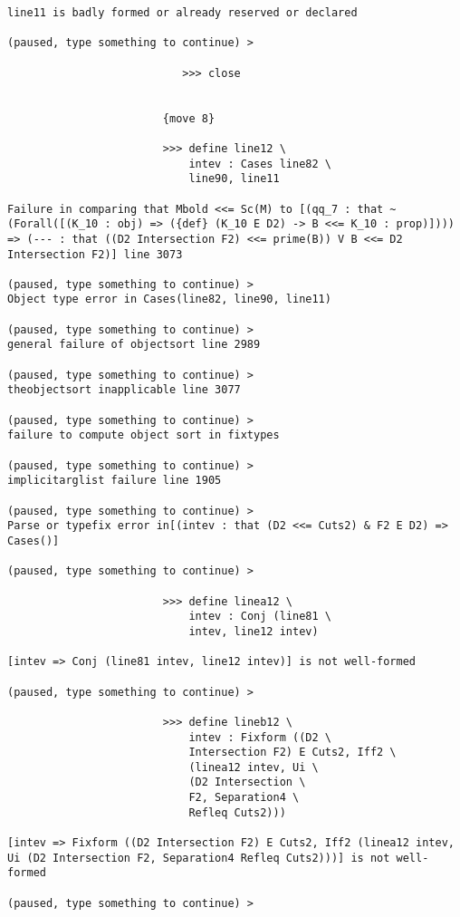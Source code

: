 \documentclass[12pt]{article}
\begin{document}
\begin{verbatim}
line11 is badly formed or already reserved or declared

(paused, type something to continue) >

                           >>> close


                        {move 8}

                        >>> define line12 \
                            intev : Cases line82 \
                            line90, line11

Failure in comparing that Mbold <<= Sc(M) to [(qq_7 : that ~(Forall([(K_10 : obj) => ({def} (K_10 E D2) -> B <<= K_10 : prop)]))) => (--- : that ((D2 Intersection F2) <<= prime(B)) V B <<= D2 Intersection F2)] line 3073

(paused, type something to continue) >
Object type error in Cases(line82, line90, line11)

(paused, type something to continue) >
general failure of objectsort line 2989

(paused, type something to continue) >
theobjectsort inapplicable line 3077

(paused, type something to continue) >
failure to compute object sort in fixtypes

(paused, type something to continue) >
implicitarglist failure line 1905

(paused, type something to continue) >
Parse or typefix error in[(intev : that (D2 <<= Cuts2) & F2 E D2) => Cases()]

(paused, type something to continue) >

                        >>> define linea12 \
                            intev : Conj (line81 \
                            intev, line12 intev)

[intev => Conj (line81 intev, line12 intev)] is not well-formed

(paused, type something to continue) >

                        >>> define lineb12 \
                            intev : Fixform ((D2 \
                            Intersection F2) E Cuts2, Iff2 \
                            (linea12 intev, Ui \
                            (D2 Intersection \
                            F2, Separation4 \
                            Refleq Cuts2)))

[intev => Fixform ((D2 Intersection F2) E Cuts2, Iff2 (linea12 intev, Ui (D2 Intersection F2, Separation4 Refleq Cuts2)))] is not well-formed

(paused, type something to continue) >


\end{verbatim}
\end{document}
